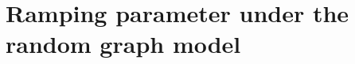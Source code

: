 \chapter{Ramping parameter under the random graph model} %
\label{cha:ramping_parameter_under_the_random_graph_model}

